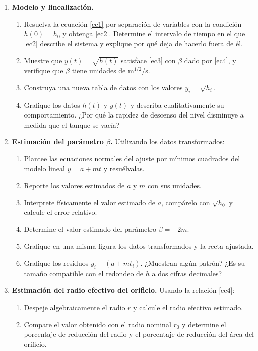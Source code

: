 \documentclass[oneside,letter,spanish,activeacute,english,links,10pt]{amcaGCS_EDO}
\begin{document}
\begin{enumerate}
	\item {\bf Modelo y linealización.}
	\begin{enumerate}
		\item Resuelva la ecuación \eqref{ec1} por separación de variables con la condición $h(0)=h_0$ y obtenga \eqref{ec2}. Determine el intervalo de tiempo en el que \eqref{ec2} describe el sistema y explique por qué deja de hacerlo fuera de él.
		\item Muestre que $y(t)=\sqrt{h(t)}$ satisface \eqref{ec3} con $\beta$ dado por \eqref{ec4}, y verifique que $\beta$ tiene unidades de m$^{1/2}$/s.
		\item Construya una nueva tabla de datos con los valores $y_i=\sqrt{h_i}$.
		\item Grafique los datos $h(t)$ y $y(t)$ y describa cualitativamente su comportamiento. ¿Por qué la rapidez de descenso del nivel disminuye a medida que el tanque se vacía?
	\end{enumerate}
	
	\item {\bf Estimación del parámetro $\beta$.}
	Utilizando los datos transformados:
	\begin{enumerate}
		\item Plantee las ecuaciones normales del ajuste por mínimos cuadrados del modelo lineal $y=a+m t$ y resuélvalas.
		\item Reporte los valores estimados de $a$ y $m$ con sus unidades.
		\item Interprete físicamente el valor estimado de $a$, compárelo con $\sqrt{h_0}$ y calcule el error relativo.
		\item Determine el valor estimado del parámetro $\beta=-2m$.
		\item Grafique en una misma figura los datos transformados y la recta ajustada.
		\item Grafique los residuos $y_i-(a+m t_i)$. ¿Muestran algún patrón? ¿Es su tamaño compatible con el redondeo de $h$ a dos cifras decimales?
	\end{enumerate}
	
	\item {\bf Estimación del radio efectivo del orificio.}
	Usando la relación \eqref{ec4}:
	\begin{enumerate}
		\item Despeje algebraicamente el radio $r$ y calcule el radio efectivo estimado.
		\item Compare el valor obtenido con el radio nominal $r_0$ y determine el porcentaje de reducción del radio y el porcentaje de reducción del área del orificio.
	\end{enumerate}
	

\end{enumerate}
\end{document}
